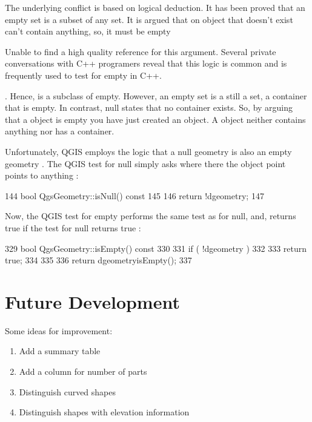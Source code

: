 \documentclass[letterpaper,11pt,english]{sphinxmanual}
\begin{document}
The underlying conflict is based on logical deduction.  It has been proved that an empty set is a subset of any set.  It is argued that on object that doesn’t exist can’t contain anything, so, it must be empty %
\begin{footnote}[3]\sphinxAtStartFootnote
Unable to find a high quality reference for this argument.  Several private conversations with C++ programers reveal that this logic is common and is frequently used to test for empty in C++.
%
\end{footnote}.  Hence,  is a subclass of empty.  However, an empty set is a still a set, a container that is empty.  In contrast, null states that no container exists.  So, by arguing that a  object is empty you have just created an object.  A  object neither contains anything nor has a container.

Unfortunately, QGIS employs the logic that a null geometry is also an empty geometry .    The QGIS test for null simply asks where there the object point points to anything :

%
\begin{sphinxVerbatim}[commandchars=\\\{\}]
144 bool QgsGeometry::isNull() const
145 \PYGZob{}
146  return !d\PYGZhy{}\PYGZgt{}geometry;
147 \PYGZcb{}
\end{sphinxVerbatim}

Now, the QGIS test for empty performs the same test as for null, and, returns true if the test for null returns true :

%
\begin{sphinxVerbatim}[commandchars=\\\{\}]
329 bool QgsGeometry::isEmpty() const
330 \PYGZob{}
331  if ( !d\PYGZhy{}\PYGZgt{}geometry )
332  \PYGZob{}
333  return true;
334  \PYGZcb{}
335
336  return d\PYGZhy{}\PYGZgt{}geometry\PYGZhy{}\PYGZgt{}isEmpty();
337 \PYGZcb{}
\end{sphinxVerbatim}


\section{Future Development}
\label{\detokenize{concept:future-development}}
Some ideas for improvement:
\begin{enumerate}
\def\theenumi{\arabic{enumi}}
\def\labelenumi{\theenumi .}
\makeatletter\def\p@enumii{\p@enumi \theenumi .}\makeatother
\item {} 
Add a summary table

\item {} 
Add a column for number of parts

\item {} 
Distinguish curved shapes

\item {} 
Distinguish shapes with elevation information

\end{enumerate}
\end{document}
